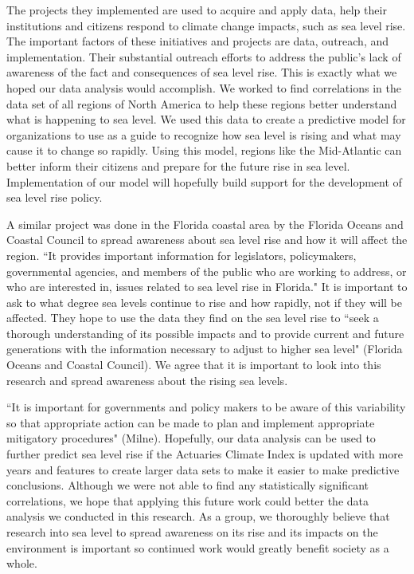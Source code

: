 \documentclass[12pt]{report}
\begin{document}
\par The projects they implemented are used to acquire and apply data, help their institutions and citizens respond to climate change impacts, such as sea level rise. The important factors of these initiatives and projects are data, outreach, and implementation. Their substantial outreach efforts to address the public’s lack of awareness of the fact and consequences of sea level rise. This is exactly what we hoped our data analysis would accomplish. We worked to find correlations in the data set of all regions of North America to help these regions better understand what is happening to sea level. We used this data to create a predictive model for organizations to use as a guide to recognize how sea level is rising and what may cause it to change so rapidly. Using this model, regions like the Mid-Atlantic can better inform their citizens and prepare for the future rise in sea level. Implementation of our model will hopefully build support for the development of sea level rise policy. 
\par A similar project was done in the Florida coastal area by the Florida Oceans and Coastal Council to spread awareness about sea level rise and how it will affect the region. \textquotedblleft It provides important information for legislators, policymakers, governmental agencies, and members of the public who are working to address, or who are interested in, issues related to sea level rise in Florida." It is important to ask to what degree sea levels continue to rise and how rapidly, not if they will be affected. They hope to use the data they find on the sea level rise to \textquotedblleft seek a thorough understanding of its possible impacts and to provide current and future generations with the information necessary to adjust to higher sea level" (Florida Oceans and Coastal Council). We agree that it is important to look into this research and spread awareness about the rising sea levels. 
\par \textquotedblleft It is important for governments and policy makers to be aware of this variability so that appropriate action can be made to plan and implement appropriate mitigatory procedures" (Milne). Hopefully, our data analysis can be used to further predict sea level rise if the Actuaries Climate Index is updated with more years and features to create larger data sets to make it easier to make predictive conclusions. Although we were not able to find any statistically significant correlations, we hope that applying this future work could better the data analysis we conducted in this research. As a group, we thoroughly believe that research into sea level to spread awareness on its rise and its impacts on the environment is important so continued work would greatly benefit society as a whole. 
\end{document}
